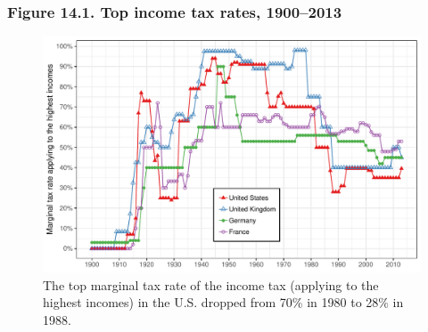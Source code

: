 \documentclass[t]{beamer}\usepackage[]{graphicx}\usepackage[]{color}
\newenvironment{knitrout}{}{} %
\begin{document}
\begin{frame}[label=Figure_14_1]
\frametitle{Figure 14.1. Top income tax rates, 1900--2013}
\begin{figure}[t]
\begin{minipage}[b]{\textwidth}
\centering
\begin{knitrout}\footnotesize
{}\color{fgcolor}

{\centering \includegraphics[width=1\linewidth]{figures/color/Figure_14_1} 

}



\end{knitrout}
\caption{The top marginal tax rate of the income tax (applying to the highest incomes) in the U.S. dropped from 70\% in 1980 to 28\% in 1988.}
\end{minipage}
\end{figure}
\end{frame}
\end{document}
